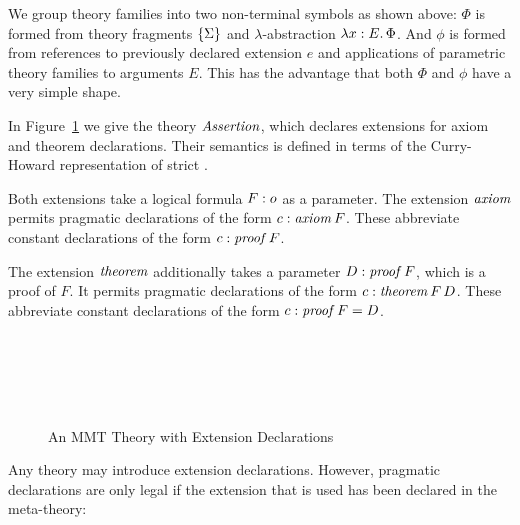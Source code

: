 We group theory families into two non-terminal symbols as shown above: $\Phi$ is formed from theory fragments $\{\Sigma\}$ and $\lambda$-abstraction $\lambda x:E.\,\Phi$. And $\phi$ is formed from references to previously declared extension $e$ and applications of parametric theory families to arguments $E$.
This has the advantage that both $\Phi$ and $\phi$ have a very simple shape.


\begin{example}
In Figure~\ref{fig:mmt-ext} we give the theory $\mathit{Assertion}$, which declares extensions for axiom and theorem declarations. Their semantics is defined in terms of the Curry-Howard representation of strict {\omdoc}.

Both extensions take a logical formula $F:o$ as a parameter.
The extension $\mathit{axiom}$ permits pragmatic declarations of the form $c:\mathit{axiom}\,F$. These abbreviate {\mmt} constant declarations of the form $c:\mathit{proof}\,F$.

The extension $\mathit{theorem}$ additionally takes a parameter $D:\mathit{proof}\,F$, which is a proof of $F$. It permits pragmatic declarations of the form $c : \mathit{theorem}\,F\,D$. These abbreviate {\mmt} constant declarations of the form $c:\mathit{proof}\,F = D$.

\begin{figure}[ht]
\vspace{-1.5em}
\begin{center}
\begin{twelfsig}
\tsig{\Assertions}\\
\tmeta{\Forms}{}\\
\\
\\
\tsigend
\end{twelfsig}
\end{center}
\vspace{-1em}
\caption{An MMT Theory with Extension Declarations}\label{fig:mmt-ext}
\vspace{-1.5em}
\end{figure}
\end{example}

Any {\mmt} theory may introduce extension declarations. However, pragmatic declarations
are only legal if the extension that is used has been declared in the meta-theory:

